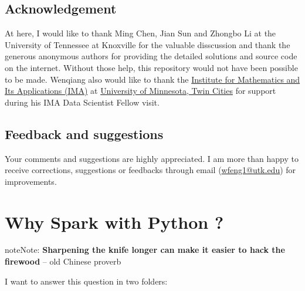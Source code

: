 \documentclass[letterpaper,11pt,english]{sphinxmanual}
\begin{document}
\section{Acknowledgement}
\label{preface:acknowledgement}
At here, I would like to thank Ming Chen, Jian Sun and Zhongbo Li at the
University of Tennessee at Knoxville for the valuable disscussion
and thank the generous anonymous authors for providing the detailed
solutions and source code on the internet. Without those help,
this repository would not have been possible to be made. Wenqiang
also would like to thank the \href{https://www.ima.umn.edu/}{Institute for Mathematics and Its
Applications (IMA)} at \href{https://twin-cities.umn.edu/}{University of Minnesota, Twin Cities}
for support during his IMA Data Scientist Fellow visit.


\section{Feedback and suggestions}
\label{preface:feedback-and-suggestions}
Your comments and suggestions are highly appreciated. I am more
than happy to receive corrections, suggestions or feedbacks through
email (\href{mailto:wfeng1@utk.edu}{wfeng1@utk.edu}) for improvements.


\chapter{Why Spark with Python ?}
\label{why:university-of-minnesota-twin-cities}\label{why::doc}\label{why:why}\label{why:why-spark-with-python}
\begin{notice}{note}{Note:}
\textbf{Sharpening the knife longer can make it easier to hack the firewood} -- old Chinese proverb
\end{notice}

I want to answer this question in two folders:
\end{document}
